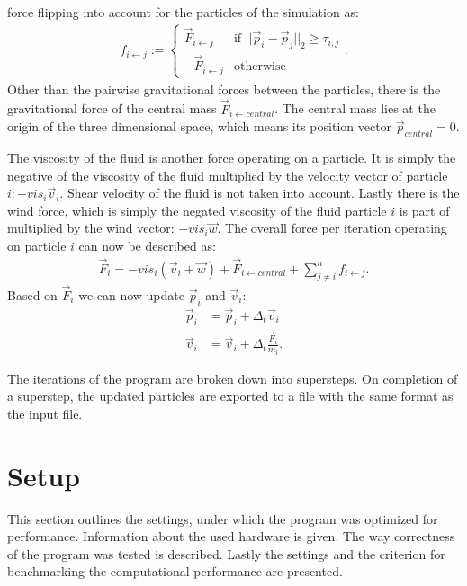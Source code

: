 \documentclass[twoside,11pt]{article}
\begin{document}
force flipping into account for the particles of the simulation as:
\begin{align}
  \label{eq:f}
  f_{i \leftarrow j} := \begin{cases}
    \vec{F}_{i \leftarrow j} &\text{if }
      ||\vec{p}_i - \vec{p}_j||_2 \ge \tau_{i,j} \\
    -\vec{F}_{i \leftarrow j} &\text{otherwise}
  \end{cases}.
\end{align}
Other than the pairwise gravitational forces between the particles,
there is the gravitational force of the central mass
$\vec{F}_{i \leftarrow central}$.
The central mass lies at the origin of the three dimensional space,
which means its position vector $\vec{p}_{central} = 0$.

The viscosity of the fluid is another force operating on a particle.
It is simply the negative of the viscosity of the fluid multiplied
by the velocity vector of particle $i: -vis_i \vec{v}_i$.
Shear velocity of the fluid is not taken into account.
Lastly there is the wind force, which is simply the negated viscosity
of the fluid particle $i$ is part of multiplied by the wind vector:
$-vis_i \vec{w}$.
The overall force per iteration operating on particle $i$ can now
be described as:
\begin{align}
  \label{eq:F_all}
  \vec{F}_i = -vis_i(\vec{v}_i + \vec{w}) +
              \vec{F}_{i \leftarrow central} +
              \sum_{j\neq i}^n f_{i \leftarrow j}.
\end{align}
Based on $\vec{F}_i$ we can now update $\vec{p}_i$ and $\vec{v}_i$:
\begin{align}
  \label{eq:p}
  \vec{p}_i &= \vec{p}_i + \Delta_t \vec{v}_i \\
  \label{eq:v}
  \vec{v}_i &= \vec{v}_i + \Delta_t \frac{\vec{F}_i}{m_i}.
\end{align}

The iterations of the program are broken down into supersteps.
On completion of a superstep, the updated particles are exported to a
file with the same format as the input file.


\section{Setup} %
\label{sec:setup}

This section outlines the settings, under which the program was
optimized for performance. Information about the used hardware is
given.
The way correctness of the program was tested is described.
Lastly the settings and the criterion for benchmarking the
computational performance are presented.
\end{document}
